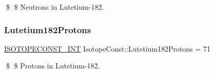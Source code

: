 \$ \$ Neutrons in Lutetium-\/182. \mbox{\label{group___isotope_const-_lutetium-_lu182_ga10879a8bfc9fcb8208259f0fd327c843}} 
\subsubsection{\texorpdfstring{Lutetium182\+Protons}{Lutetium182Protons}}
{\footnotesize\ttfamily \mbox{\hyperlink{group___isotope_const-_macros_ga5f18360b3e99483a35c32d789e62621c}{I\+S\+O\+T\+O\+P\+E\+C\+O\+N\+S\+T\+\_\+\+I\+NT}} Isotope\+Const\+::\+Lutetium182\+Protons = 71}

\$ \$ Protons in Lutetium-\/182. 